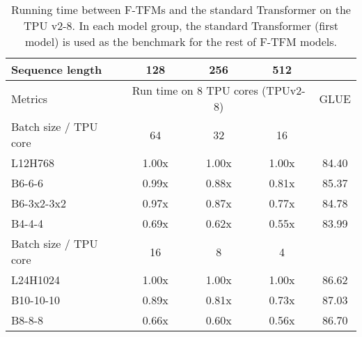 \documentclass{article}
\theoremstyle{custom}
\begin{document}
\begin{table}[!ht]
\centering
\begin{tabular}{l|c|c|c|c}
	\toprule
	Sequence length & \hspace{0.2in} 128 \hspace{0.2in} & \hspace{0.2in} 256 \hspace{0.2in} & \hspace{0.2in} 512 \hspace{0.2in} & \\
	\midrule
	Metrics
	& \multicolumn{3}{c|}{Run time on 8 TPU cores (TPUv2-8)} & GLUE \\
	\midrule\midrule
	Batch size / TPU core & 64 & 32 & 16 & \\
    \cmidrule(r){1-1}\cmidrule(lr){2-2}\cmidrule(lr){3-3}\cmidrule(lr){4-4}\cmidrule(l){5-5}
	L12H768
	& 1.00x & 1.00x & 1.00x & 84.40 \\
	B6-6-6
	& 0.99x & 0.88x & 0.81x & 85.37 \\
	B6-3x2-3x2
	& 0.97x & 0.87x & 0.77x & 84.78 \\
	B4-4-4
	& 0.69x & 0.62x & 0.55x & 83.99 \\
	\midrule\midrule
	Batch size / TPU core & 16 & 8 & 4 & \\
	\cmidrule(r){1-1}\cmidrule(lr){2-2}\cmidrule(lr){3-3}\cmidrule(lr){4-4}\cmidrule(l){5-5}
	L24H1024
	& 1.00x & 1.00x & 1.00x & 86.62 \\
	B10-10-10
	& 0.89x & 0.81x & 0.73x & 87.03 \\
	B8-8-8
	& 0.66x & 0.60x & 0.56x & 86.70 \\
	\bottomrule
	\end{tabular}
	\caption{
		Running time between F-TFMs and the standard Transformer on the TPU v2-8. 
		In each model group, the standard Transformer (first model) is used as the benchmark for the rest of F-TFM models.
	}
	\label{tab:tpu-time}
\end{table}
\end{document}

